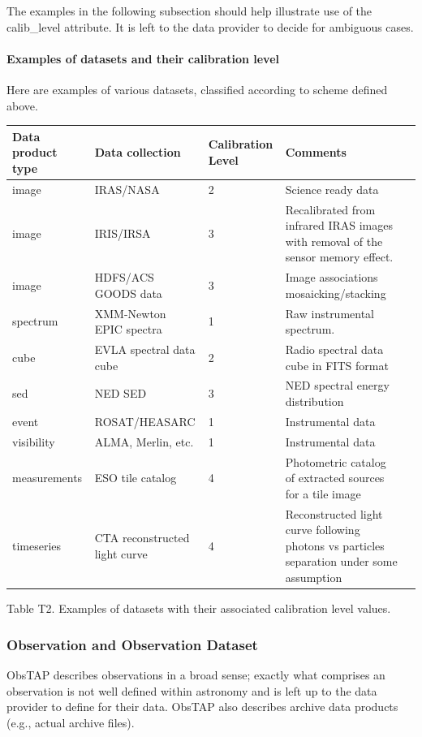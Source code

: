 \documentclass[11pt,a4paper]{ivoa}
\begin{document}
The examples in the following subsection should help illustrate use of the calib\_level attribute. It is left to the
data provider to decide for ambiguous cases.

\paragraph[Examples of datasets and their calibration level]{Examples of datasets and their calibration level}
Here are examples of various datasets, classified according to scheme defined above. 

\begin{tabular}{|l|p{}|p{}|p{}|p{}|}
\hline
Data product type & Data collection & Calibration Level & Comments\\\hline
image & IRAS/NASA & 2 & Science ready data\\\hline
image & IRIS/IRSA & 3 & Recalibrated from infrared IRAS images with removal of the sensor memory effect.\\\hline
image & HDFS/ACS GOODS data & 3 & Image associations mosaicking/stacking\\\hline
spectrum & XMM-Newton EPIC spectra & 1 & Raw instrumental spectrum.\\\hline
cube & EVLA spectral data cube & 2 & Radio spectral data cube in FITS format\\\hline
sed & NED SED & 3 & NED spectral energy distribution\\\hline
event & ROSAT/HEASARC & 1 & Instrumental data\\\hline
visibility & ALMA, Merlin, etc. & 1 & Instrumental data\\\hline
measurements & ESO tile catalog  & 4 & Photometric catalog of extracted sources for a tile image\\\hline
timeseries & CTA reconstructed light curve  & 4 & Reconstructed light curve following photons vs particles separation under some assumption \\\hline
\end{tabular}
\label{T2}Table T2. Examples of datasets with their associated calibration level values.

\subsubsection{Observation and Observation Dataset}
\label{bkm:Ref450327253}ObsTAP describes observations in a broad sense; exactly what comprises an
{\textquotedbl}observation{\textquotedbl} is not well defined within astronomy and is left up to the data provider to
define for their data.  ObsTAP also describes archive data products (e.g., actual archive files). 
\end{document}
